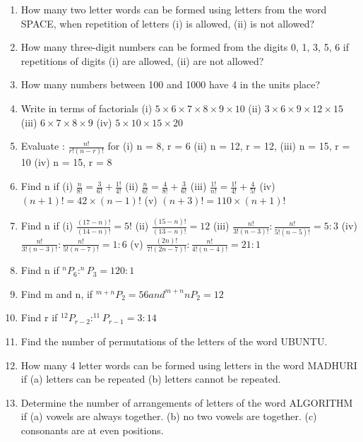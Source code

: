 \documentclass[14pt]{article}
\begin{document}
\begin{multicols}{2}
\begin{enumerate}[resume]
\item How many two letter words can be formed
using letters from the word SPACE, when
repetition of letters (i) is allowed, (ii) is not
allowed?
\item How many three-digit numbers can be
formed from the digits 0, 1, 3, 5, 6 if
repetitions of digits (i) are allowed, (ii) are
not allowed?
\item How many numbers between 100 and 1000
have 4 in the units place?
		 
\item Write in terms of factorials
(i)	$5 \times 6 \times 7 \times 8 \times 9 \times 10	$
(ii)	$3 \times 6 \times 9 \times 12 \times 15$
(iii)	$6 \times 7 \times 8 \times 9$
(iv)  $5 \times 10 \times 15 \times 20$

\item 
Evaluate : $\frac{n!}{r!(n-r)!}$ for  (i)	 n = 8, r = 6	 (ii)	 n = 12, r = 12,
	 (iii)	 n = 15, r = 10	 (iv)	 n = 15, r = 8
	 
\item Find n if
(i) $\frac{n}{8!}= \frac{3}{6!}+\frac{1!}{4!}$
(ii) $\frac{n}{6!}= \frac{4}{8!}+\frac{3}{6!}$
(iii) $\frac{1!}{n!}= \frac{1!}{4!}+\frac{4}{5!}$
(iv) $(n+1)!=42 \times (n-1)!$
(v) $(n+3)!=110 \times (n+1)!$

\item Find n if
(i) $\frac{(17-n)!}{(14-n)!}= 5!$
(ii) $\frac{(15-n)!}{(13-n)!}= 12$
(iii) $\frac{n!}{3!(n-3)!}:\frac{n!}{5!(n-5)!}=5:3$
(iv) $\frac{n!}{3!(n-3)!}:\frac{n!}{5!(n-7)!}=1:6$
(v) $\frac{(2n)!}{7!(2n-7)!}:\frac{n!}{4!(n-4)!}=21:1$ 

\item Find n if $^nP_6 : ^nP_3=120:1$

\item Find m and n, if $^{m+n}P_2 = 56 and ^{m+n}nP_2=12$

\item Find r if $^12P_{r-2} : ^11P_{r-1}=3:14$

\item Find the number of permutations of the
letters of the word UBUNTU.

\item How many 4 letter words can be formed
using letters in the word MADHURI if
(a) letters can be repeated (b) letters cannot
be repeated.



\item Determine the number of arrangements of
letters of the word ALGORITHM if
(a) vowels are always together.
(b) no two vowels are together.
(c) consonants are at even positions.


\end{enumerate}
\end{multicols}
\end{document}
